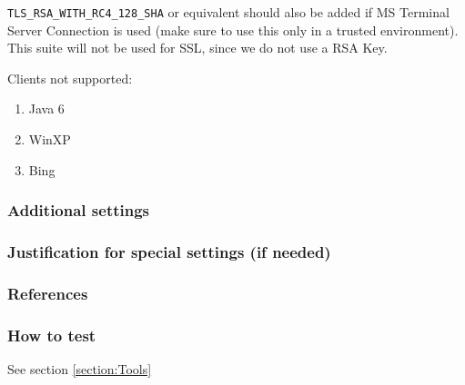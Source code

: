 \verb|TLS_RSA_WITH_RC4_128_SHA| or equivalent should also be added if
MS Terminal Server Connection is used (make sure to use this only in a
trusted environment). This suite will not be used for SSL, since we do
not use a RSA Key.




Clients not supported:
\begin{enumerate}
\item Java 6
\item WinXP
\item Bing
\end{enumerate}

\subsubsection{Additional settings}


\subsubsection{Justification for special settings (if needed)}


\subsubsection{References}



\subsubsection{How to test}
See section \ref{section:Tools}


